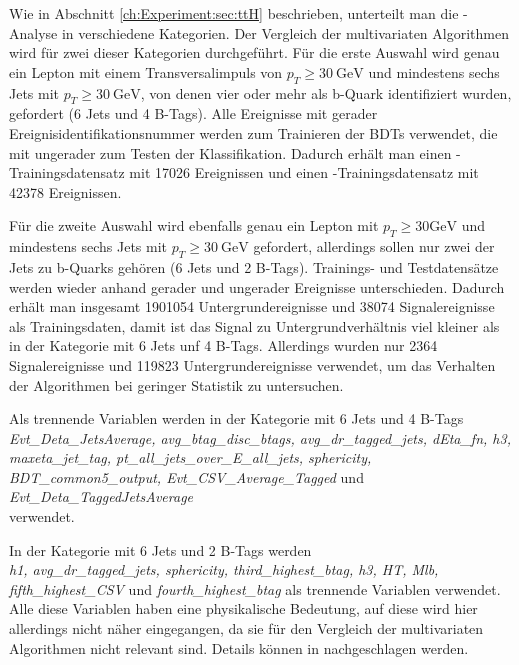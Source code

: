 Wie in Abschnitt \ref{ch:Experiment:sec:ttH} beschrieben, unterteilt man die \ttH-Analyse in verschiedene Kategorien. Der Vergleich der multivariaten Algorithmen wird f\"ur zwei dieser Kategorien durchgef\"uhrt. F\"ur die erste Auswahl wird genau ein Lepton mit einem Transversalimpuls von $p_T\geq \num{30}~\si{\giga\electronvolt}$ und mindestens sechs Jets mit $p_T\geq \num{30}~\si{\giga\electronvolt}$, von denen vier oder mehr als b-Quark identifiziert wurden, gefordert (6 Jets und 4 B-Tags). Alle Ereignisse mit gerader Ereignisidentifikationsnummer werden zum Trainieren der BDTs verwendet, die mit ungerader zum Testen der Klassifikation. Dadurch erh\"alt man einen \ttH-Trainingsdatensatz mit 17026 Ereignissen und einen \ttb-Trainingsdatensatz mit 42378 Ereignissen.

F\"ur die zweite Auswahl wird ebenfalls genau ein Lepton mit $p_T\geq \num{30} \si{\giga\electronvolt}$ und mindestens sechs Jets mit $p_T\geq \num{30}~\si{\giga\electronvolt}$ gefordert, allerdings sollen nur zwei der Jets zu b-Quarks geh\"oren (6 Jets und 2 B-Tags). Trainings- und Testdatens\"atze werden wieder anhand gerader und ungerader Ereignisse unterschieden. Dadurch erh\"alt man insgesamt 1901054 Untergrundereignisse und 38074 Signalereignisse als Trainingsdaten, damit ist das Signal zu Untergrundverh\"altnis viel kleiner als in der Kategorie mit 6 Jets unf 4 B-Tags. Allerdings wurden nur 2364 Signalereignisse und 119823 Untergrundereignisse verwendet, um das Verhalten der Algorithmen bei geringer Statistik zu untersuchen. 

Als trennende Variablen werden in der Kategorie mit 6 Jets und 4 B-Tags\\
{\it Evt\_Deta\_JetsAverage, avg\_btag\_disc\_btags, avg\_dr\_tagged\_jets, dEta\_fn, h3, maxeta\_jet\_tag, pt\_all\_jets\_over\_E\_all\_jets, sphericity, BDT\_common5\_output, Evt\_CSV\_Average\_Tagged} und {\it Evt\_Deta\_TaggedJetsAverage}\\verwendet.

In der Kategorie mit 6 Jets und 2 B-Tags werden \\ {\it h1, avg\_dr\_tagged\_jets, sphericity, third\_highest\_btag, h3, HT, Mlb, fifth\_highest\_CSV} und {\it fourth\_highest\_btag} als trennende Variablen verwendet.\\
Alle diese Variablen haben eine physikalische Bedeutung, auf diese wird hier allerdings nicht n\"aher eingegangen, da sie f\"ur den Vergleich der multivariaten Algorithmen nicht relevant sind. Details k\"onnen in \cite{CMS-PAS-HIG-16-004} nachgeschlagen werden.

